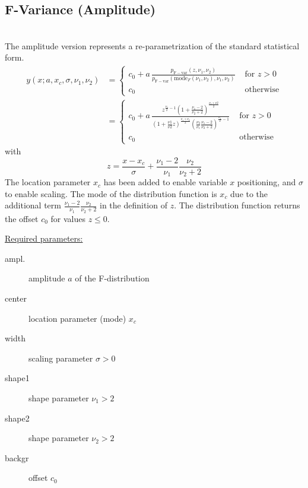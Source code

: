\subsection{F-Variance (Amplitude)} ~\\
\label{sec:FVarianceAmplitude}
The amplitude version represents a re-parametrization of the standard statistical form.
\begin{align}
y(x;a,x_c,\sigma,\nu_1,\nu_2)
&=
\begin{cases}
c_0+a\,\frac{p_\mathrm{F-var}(z,\nu_1,\nu_2)}{p_\mathrm{F-var}(\mathrm{mode}_F(\nu_1,\nu_2),\nu_1,\nu_2)}  & \mbox{ for } z>0\\
c_0 & \mbox{ otherwise}
\end{cases} \nonumber\\
&=
\begin{cases}
c_0+a\,\frac{z^{\frac{\nu_1}{2}-1}\left(1+\frac{\nu_1-2}{\nu_2+2}\right)^{\frac{\nu_1+\nu2}{2}}}{\left(1+\frac{\nu1}{\nu2}z\right)^{\frac{\nu_1+\nu_2}{2}}\left(\frac{\nu_2}{\nu_1}\frac{\nu_1-2}{\nu_2+2}\right)^{\frac{\nu_1}{2}-1}}   & \mbox{ for } z>0\\
c_0 & \mbox{ otherwise}
\end{cases}
\end{align}
with
\begin{equation}
z = \frac{x-x_c}{\sigma}+\frac{\nu_1-2}{\nu_1}\frac{\nu_2}{\nu_2+2}
\end{equation}
The location parameter $x_c$ has been added to enable variable $x$ positioning, and $\sigma$
to enable scaling. The mode of the distribution function is $x_c$ due to the additional term
$\frac{\nu_1-2}{\nu_1}\frac{\nu_2}{\nu_2+2}$ in the definition of $z$. The distribution
function returns the offset $c_0$ for values $z\leq 0$.

\vspace{5mm}

\uline{Required parameters:}
\begin{description}
    \item[ampl.] amplitude $a$ of the F-distribution
    \item[center] location parameter (mode) $x_c$
    \item[width] scaling parameter $\sigma>0$
    \item[shape1] shape parameter $\nu_1>2$
    \item[shape2] shape parameter $\nu_2>2$
    \item[backgr] offset $c_0$
\end{description}

